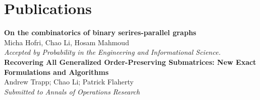 \documentclass[]{friggeri-cv}
\begin{document}
\section{Publications}
\textbf{On the combinatorics of binary serires-parallel graphs}\\
Micha Hofri, Chao Li, Hosam Mahmoud\\
\emph{Accepted by Probability in the Engineering and Informational Science.}\\
\textbf{Recovering All Generalized Order-Preserving Submatrices: New Exact
Formulations and Algorithms}\\
Andrew Trapp; Chao Li; Patrick Flaherty\\
\emph{Submitted to Annals of Operations Research}
\end{document}
